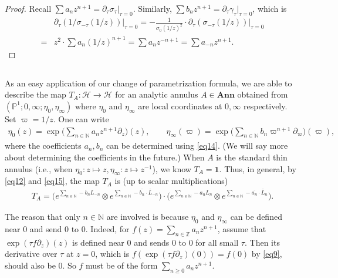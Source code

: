 \documentclass[12pt,a4paper,notitlepage]{article}
\theoremstyle{definition}
\theoremstyle{plain}
\newcommand{\mc}{\mathcal}
\newcommand{\ovl}{\overline}
\newcommand{\id}{\mathbf{1}}
\newcommand{\Nbb}{\mathbb N}
\newcommand{\Zbb}{\mathbb Z}
\newcommand{\Pbb}{\mathbb P}
\newcommand{\Ann}{\mathbf{Ann}}
\numberwithin{equation}{section}
\begin{document}
\begin{proof}
Recall $\sum a_nz^{n+1}=\partial_\tau\sigma_\tau|_{\tau=0}$.  Similarly,  $\sum b_nz^{n+1}=\partial_\tau\gamma_\tau|_{\tau=0}$, which is
\begin{align*}
&\partial_\tau(1/\sigma_{-\tau}(1/z))\big|_{\tau=0}=-\frac 1{\sigma_0(1/z)^2}\cdot \partial_\tau(\sigma_{-\tau}(1/z))\big|_{\tau=0}	\\
=&z^2\cdot \sum a_n(1/z)^{n+1}=\sum a_nz^{-n+1}=\sum a_{-n}z^{n+1}.
\end{align*}
\end{proof}



\subsection{}\label{lb16}

As an easy application of our change of parametrization formula, we are able to describe the map $T_A:\mc H\rightarrow\mc H$ for an analytic annulus $A\in\Ann$ obtained from $(\Pbb^1;0,\infty;\eta_0,\eta_\infty)$ where $\eta_0$ and $\eta_\infty$ are local coordinates at $0,\infty$ respectively. Set $\varpi=1/z$. One can write
\begin{align*}
\eta_0(z)=\exp\Big(\sum_{n\in\Nbb} a_nz^{n+1}\partial_z\Big)(z),\qquad \eta_\infty(\varpi)=\exp\Big(\sum_{n\in\Nbb} b_n \varpi^{n+1}\partial_\varpi\Big)(\varpi),	
\end{align*}
where the coefficients $a_n,b_n$ can be determined using \eqref{eq14}. (We will say more about determining the coefficients in the future.) When $A$ is the standard thin annulus (i.e., when $\eta_0:z\mapsto z,\eta_\infty:z\mapsto z^{-1}$), we know $T_A=\id$. Thus, in general, by \eqref{eq12} and \eqref{eq15}, the map $T_A$ is (up to scalar multiplications)
\begin{align*}
T_A=\Big(e^{\sum_{n\in\Nbb}-b_nL_{-n}}\otimes e^{\sum_{n\in\Nbb}-\ovl{b_n}\cdot \ovl L_{-n}}\Big) \cdot \Big(e^{\sum_{n\in\Nbb} -a_nL_n}\otimes e^{\sum_{n\in\Nbb} -\ovl{a_n}\cdot \ovl L_n}\Big).	
\end{align*}

The reason that only $n\in\Nbb$ are involved is because $\eta_0$ and $\eta_\infty$ can be defined near $0$ and send $0$ to $0$. Indeed, for $f(z)=\sum_{n\in\Zbb} a_n z^{n+1}$, assume that $\exp(\tau f\partial_z)(z)$ is defined near $0$ and sends $0$ to $0$ for all small $\tau$. Then its derivative over $\tau$ at $z=0$, which is $f(\exp(\tau f\partial_z)(0))=f(0)$ by \eqref{eq9}, should also be $0$. So $f$ must be of the form $\sum_{n\geq 0}a_nz^{n+1}$.
\end{document}
